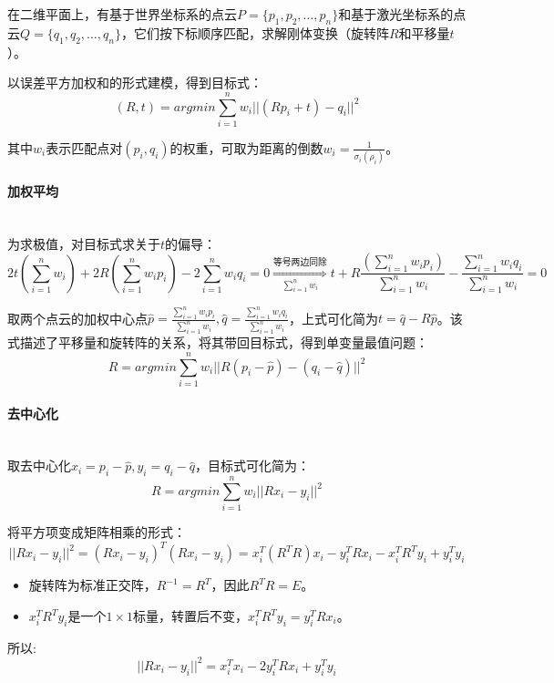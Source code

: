 \documentclass[
12pt, %
a4paper, 
oneside, %
headinclude,footinclude, %
]{scrartcl}
\begin{document}
在二维平面上，有基于世界坐标系的点云$ P = \{p_1, p_2, \dots, p_n\} $和基于激光坐标系的点云$ Q = \{q_1, q_2, \dots, q_n\} $，它们按下标顺序匹配，求解刚体变换（旋转阵$ R $和平移量$ t $）。

以误差平方加权和的形式建模，得到目标式：
$$ (R, t) = argmin \sum_{i = 1}^{n}w_i ||(R p_i + t) - q_i||^2 $$

其中$ w_i $表示匹配点对$ (p_i, q_i) $的权重，可取为距离的倒数$ w_i = \frac{1}{\sigma_i(\rho_i)} $。
\paragraph{加权平均}~\\

为求极值，对目标式求关于$ t $的偏导：
$$ 
2t(\sum_{i = 1}^{n} w_i) + 2R(\sum_{i = 1}^{n} w_i p_i) - 2\sum_{i = 1}^{n} w_i q_i = 0 
\overset{\text{等号两边同除}}{\underset{\sum_{i = 1}^{n} w_i}{\Longrightarrow}}
t + R\frac{(\sum_{i = 1}^{n} w_i p_i)}{\sum_{i = 1}^{n} w_i} - \frac{\sum_{i = 1}^{n} w_i q_i}{\sum_{i = 1}^{n} w_i} = 0
$$

取两个点云的加权中心点$ \hat{p} = \frac{\sum_{i = 1}^{n} w_i p_i}{\sum_{i = 1}^{n} w_i}, \hat{q} = \frac{\sum_{i = 1}^{n} w_i q_i}{\sum_{i = 1}^{n} w_i} $，上式可化简为$ t = \hat{q} - R \hat{p} $。该式描述了平移量和旋转阵的关系，将其带回目标式，得到单变量最值问题：
$$ R = argmin \sum_{i = 1}^{n}w_i ||R(p_i - \hat{p}) - (q_i - \hat{q})||^2 $$
\paragraph{去中心化}~\\

取去中心化$ x_i = p_i - \hat{p}, y_i = q_i - \hat{q} $，目标式可化简为：
$$ R = argmin \sum_{i = 1}^{n}w_i ||R x_i - y_i||^2 $$

将平方项变成矩阵相乘的形式：
$$ ||Rx_i - y_i||^2 = (R x_i - y_i)^T(R x_i - y_i) = x_i^T (R^T R) x_i - y_i^T R x_i - x_i^T R^T y_i + y_i^T y_i $$
\begin{itemize}
\item 旋转阵为标准正交阵，$ R^{-1} = R^T $，因此$ R^T R = E $。
\item $ x_i^T R^T y_i $是一个$ 1 \times 1 $标量，转置后不变，$ x_i^T R^T y_i = y_i^T R x_i $。
\end{itemize}

所以:
$$ ||Rx_i - y_i||^2 = x_i^T x_i - 2 y_i^T R x_i + y_i^T y_i $$
\end{document}
